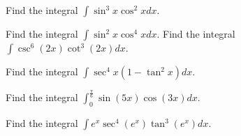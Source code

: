 \documentclass[
  course = {{MATH102 Calculus II}},
  quartile = {{2}},
  assignment = 11,%
  topic = {{7.2: Trigonometric Integrals}},
  firstexercise = 1,
  term = 202
]{aga-homework}
\begin{document}
\fbox{
\begin{minipage}{\textwidth}



\[
\displaystyle
\sin^2 x + \cos^2 x =1, \quad  \tan^2 x + 1 =\sec^2 x,  \quad  1+\cot^2 x  =\csc^2 x, 
\]

\[
\displaystyle
\cos^2 x = \frac{1 +\cos 2x }{2}, \quad \sin^2 x = \frac{1 -\cos 2x }{2}
\]

\[
\displaystyle
\begin{array}{ccc}
  \sin A\cos B & = & \frac{1}{2}\left[\sin(A-B)+\sin(A+B)\right], \\[0.2cm]
  \sin A\sin B & = & \frac{1}{2}\left[\cos(A-B)-\cos(A+B)\right], \\[0.2cm]
  \cos A\cos B & = & \frac{1}{2}\left[\cos(A-B)+\cos(A+B)\right], \\  
\end{array}
\]


\end{minipage}
}

\newpage

\problem Find the integral $\displaystyle \int \sin^3x\cos^2 x dx $.

\newpage
\problem Find the integral $\displaystyle \int \sin^2 x\cos^4 x dx $.
\newpage
\problem Find the integral $\displaystyle \int \csc^6(2x)\cot^3(2x) dx $.

\newpage
\problem Find the integral $\displaystyle \int \sec^4x\left(1-\tan^2x\right) dx $.

\newpage
\problem Find the integral $\displaystyle \int_0^{\frac{\pi}{6}} \sin(5x)\cos(3x) dx $.


\newpage

 Find the integral $\displaystyle \int e^x\sec^4(e^x)\tan^3(e^x) dx $.
\afterpage{\null\newpage}

\afterpage{\null\newpage}

\afterpage{\null\newpage}
\end{document}
